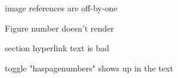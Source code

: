 image references are off-by-one

Figure number doesn't render

section hyperlink text is bad

toggle "haspagenumbers" shows up in the text